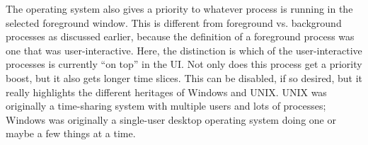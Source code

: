The operating system also gives a priority to whatever process is running in the selected foreground window. This is different from foreground vs. background processes as discussed earlier, because the definition of a foreground process was one that was user-interactive. Here, the distinction is which of the user-interactive processes is currently ``on top'' in the UI. Not only does this process get a priority boost, but it also gets longer time slices. This can be disabled, if so desired, but it really highlights the different heritages of Windows and UNIX. UNIX was originally a time-sharing system with multiple users and lots of processes; Windows was originally a single-user desktop operating system doing one or maybe a few things at a time.



